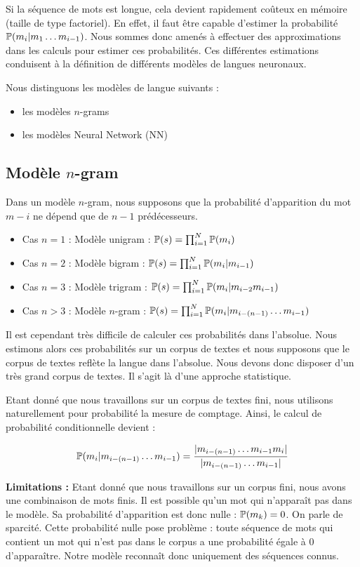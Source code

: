 Si la séquence de mots est longue, cela devient rapidement coûteux en mémoire (taille de type factoriel). En effet, il faut être capable d'estimer la probabilité $\P(m_i \vert m_1\ldots m_{i-1})$. Nous sommes donc amenés à effectuer des approximations dans les calculs pour estimer ces probabilités. Ces différentes estimations conduisent à la définition de différents modèles de langues neuronaux.

 Nous distinguons les modèles de langue suivants :

\begin{itemize}
  \item les modèles $n$-grams
  \item les modèles Neural Network (NN)
\end{itemize}

\subsection{Modèle $n$-gram}
Dans un modèle $n$-gram, nous supposons que la probabilité d'apparition du mot $m-i$ ne dépend que de $n-1$ prédécesseurs.

\begin{itemize}
  \item Cas $n=1$ : Modèle unigram : $\P(s) = \prod_{i=1}^N \P(m_i)$
  \item Cas $n=2$ : Modèle bigram : $\P(s) = \prod_{i=1}^N \P(m_i\vert m_{i-1})$
  \item Cas $n=3$ : Modèle trigram : $\P(s) = \prod_{i=1}^N \P(m_i\vert m_{i-2}m_{i-1})$
  \item Cas $n > 3$ : Modèle $n$-gram : $\P(s) = \prod_{i=1}^N \P(m_i\vert m_{i-(n-1)}\ldots m_{i-1})$
\end{itemize}

Il est cependant très difficile de calculer ces probabilités dans l'absolue. 
Nous estimons alors ces probabilités sur un corpus de textes et nous supposons que le corpus de textes reflète la langue dans l'absolue.
Nous devons donc disposer d'un très grand corpus de textes. Il s'agit là d'une approche statistique.

Etant donné que nous travaillons sur un corpus de textes fini, nous utilisons naturellement pour probabilité la mesure de comptage. Ainsi, le calcul de probabilité conditionnelle devient :

\[ \P(m_i\vert m_{i-(n-1)}\ldots m_{i-1}) = \frac{\vert m_{i-(n-1)}\ldots m_{i-1}m_i\vert}{\vert m_{i-(n-1)}\ldots m_{i-1}\vert} \]

\textbf{Limitations :} Etant donné que nous travaillons sur un corpus fini, nous avons une combinaison de mots finis. Il est possible qu'un mot qui n'apparaît pas dans le modèle. Sa probabilité d'apparition est donc nulle : $\P(m_k) = 0$. On parle de sparcité. Cette probabilité nulle pose problème : toute séquence de mots qui contient un mot qui n'est pas dans le corpus a une probabilité égale à 0 d'apparaître.
Notre modèle reconnaît donc uniquement des séquences connus.


